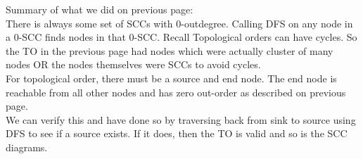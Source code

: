 \documentclass[11pt,fleqn]{article}
\begin{document}
\newpage

Summary of what we did on previous page:\\
There is always some set of SCCs with 0-outdegree. Calling DFS on any node in a 0-SCC finds nodes in that 0-SCC. Recall Topological orders can have cycles. So the TO in the previous page had nodes which were actually cluster of many nodes OR the nodes themselves were SCCs to avoid cycles.\\

For topological order, there must be a source and end node. The end node is reachable from all other nodes and has zero out-order as described on previous page.\\

We can verify this and have done so by traversing back from sink to source using DFS to see if a source exists. If it does, then the TO is valid and so is the SCC diagrams.
\end{document}
